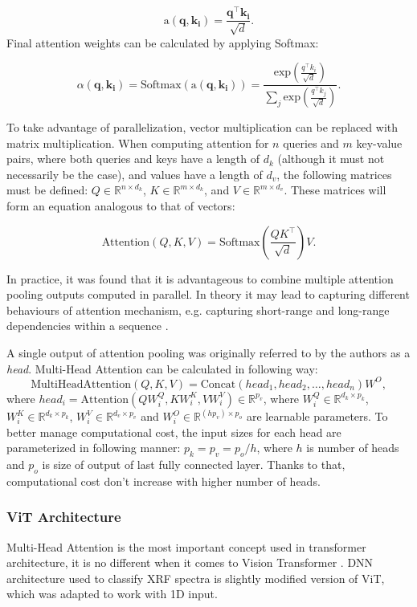 \[\text{a}(\mathbf{q}, {\mathbf{k_i}}) = \frac{\mathbf{q}^\intercal \mathbf{k_i}}{\sqrt{d}}.\]
Final attention weights can be calculated by applying Softmax: 

\[\alpha(\mathbf{q}, \mathbf{k_i}) = \text{Softmax}(\text{a}(\mathbf{q}, \mathbf{k_i})) =\frac{\text{exp}(\frac{q^\intercal k_i}{\sqrt{d}})}{\sum_j \text{exp}(\frac{q^\intercal k_j}{\sqrt{d}})}.\]

To take advantage of parallelization, vector multiplication can be replaced with matrix multiplication. When computing attention for $n$ queries and $m$ key-value pairs, where both queries and keys have a length of $d_k$ (although it must not necessarily be the case), and values have a length of $d_v$, the following matrices must be defined: $Q \in \mathbb{R}^{n \times d_k}$, $K \in \mathbb{R}^{m \times d_k}$, and $V \in \mathbb{R}^{m \times d_v}$. These matrices will form an equation analogous to that of vectors:

\[\text{Attention}(Q, K, V) = \text{Softmax}(\frac{Q K^\intercal}{\sqrt{d}})V.\]

In practice, it was found that it is advantageous to combine multiple attention pooling outputs computed in parallel. 
In theory it may lead to capturing different behaviours of attention mechanism, e.g. capturing short-range and long-range dependencies within a sequence \cite{d2lMultiHeadAttention}.


A single output of attention pooling was originally referred to by the authors as a \emph{head}. 
Multi-Head Attention can be calculated in following way: 
\[\text{MultiHeadAttention}(Q, K, V)  = \text{Concat}(head_1, head_2, \dots, head_n)W^O,\]
where $head_i = \text{Attention}(QW_i^Q, KW_i^K, VW_i^V) \in \mathbb{R}^{p_v}$, where $W_i^Q \in \mathbb{R}^{d_k \times p_k}$, $W_i^K \in \mathbb{R}^{d_k \times p_k}$, $W_i^V \in \mathbb{R}^{d_v \times p_v}$ and $W_i^O \in \mathbb{R}^{(hp_v) \times p_o}$ are learnable parameters.
To better manage computational cost, the input sizes for each head are parameterized in following manner: $p_k = p_v = p_o / h$, where $h$ is number of heads and $p_o$ is size of output of last fully connected layer. Thanks to that, computational cost don't increase with higher number of heads.

\subsubsection{ViT Architecture}
Multi-Head Attention is the most important concept used in transformer architecture, it is no different when it comes to Vision Transformer \cite{vitPaper}.
DNN architecture used to classify XRF spectra is slightly modified version of ViT, which was adapted to work with 1D input.


